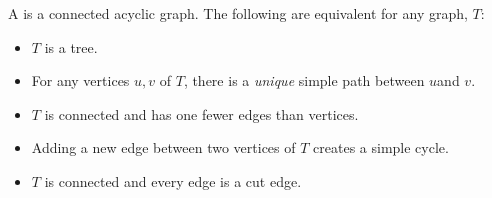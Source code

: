 \documentclass[handout]{mcs}
\begin{document}
A  is a connected acyclic graph.  The following are equivalent
for any graph, $T$:
\begin{itemize}

\item $T$ is a tree.

\item For any vertices $u,v$ of $T$, there is a \emph{unique} simple path
between $u$and $v$.

\item $T$ is connected and has one fewer edges than vertices.

\item Adding a new edge between two vertices of $T$ creates a simple
  cycle.

\item $T$ is connected and every edge is a cut edge.

\end{itemize}



\end{document}
